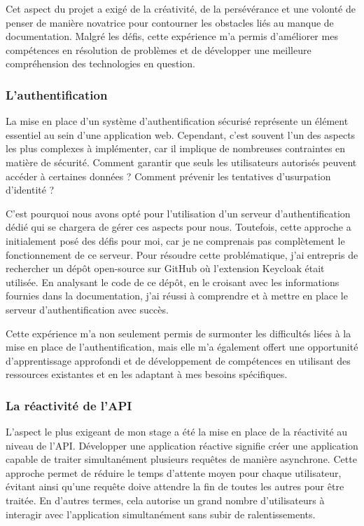 Cet aspect du projet a exigé de la créativité, de la persévérance et une volonté de penser de manière novatrice pour contourner les obstacles liés au manque de documentation. Malgré les défis, cette expérience m'a permis d'améliorer mes compétences en résolution de problèmes et de développer une meilleure compréhension des technologies en question.

\subsubsection{L'authentification}

La mise en place d'un système d'authentification sécurisé représente un élément essentiel au sein d'une application web. Cependant, c'est souvent l'un des aspects les plus complexes à implémenter, car il implique de nombreuses contraintes en matière de sécurité. Comment garantir que seuls les utilisateurs autorisés peuvent accéder à certaines données ? Comment prévenir les tentatives d'usurpation d'identité ?

C'est pourquoi nous avons opté pour l'utilisation d'un serveur d'authentification dédié qui se chargera de gérer ces aspects pour nous. Toutefois, cette approche a initialement posé des défis pour moi, car je ne comprenais pas complètement le fonctionnement de ce serveur. Pour résoudre cette problématique, j'ai entrepris de rechercher un dépôt open-source sur GitHub où l'extension Keycloak était utilisée. En analysant le code de ce dépôt, en le croisant avec les informations fournies dans la documentation, j'ai réussi à comprendre et à mettre en place le serveur d'authentification avec succès.

Cette expérience m'a non seulement permis de surmonter les difficultés liées à la mise en place de l'authentification, mais elle m'a également offert une opportunité d'apprentissage approfondi et de développement de compétences en utilisant des ressources existantes et en les adaptant à mes besoins spécifiques.

\subsubsection{La réactivité de l'API}

L'aspect le plus exigeant de mon stage a été la mise en place de la réactivité au niveau de l'API. Développer une application réactive signifie créer une application capable de traiter simultanément plusieurs requêtes de manière asynchrone. Cette approche permet de réduire le temps d'attente moyen pour chaque utilisateur, évitant ainsi qu'une requête doive attendre la fin de toutes les autres pour être traitée. En d'autres termes, cela autorise un grand nombre d'utilisateurs à interagir avec l'application simultanément sans subir de ralentissements.

